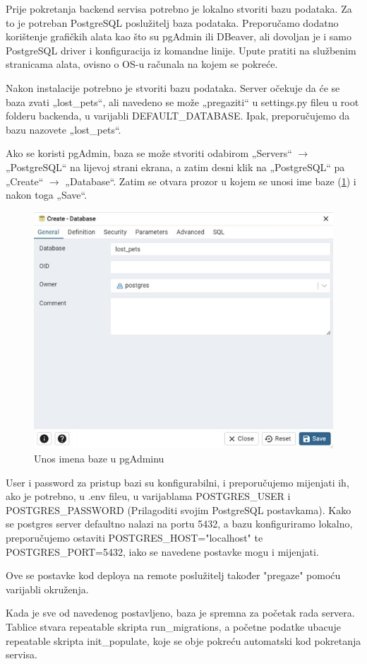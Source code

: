 		Prije pokretanja backend servisa potrebno je lokalno stvoriti bazu podataka. Za to je potreban PostgreSQL poslužitelj baza podataka. Preporučamo dodatno korištenje grafičkih alata kao što su pgAdmin ili DBeaver, ali dovoljan je i samo PostgreSQL driver i konfiguracija iz komandne linije. Upute pratiti na službenim stranicama alata, ovisno o OS-u računala na kojem se pokreće.
		
		Nakon instalacije potrebno je stvoriti bazu podataka. Server očekuje da će se baza zvati „lost\_pets“, ali navedeno se može „pregaziti“ u settings.py fileu u root folderu backenda, u varijabli DEFAULT\_DATABASE. Ipak, preporučujemo da bazu nazovete „lost\_pets“.
		
		Ako se koristi pgAdmin, baza se može stvoriti odabirom „Servers“ $\rightarrow$ „PostgreSQL“ na lijevoj strani ekrana, a zatim desni klik na „PostgreSQL“ pa „Create“ $\rightarrow$ „Database“. Zatim se otvara prozor u kojem se unosi ime baze (\ref{fig:deploy1}) i nakon toga „Save“.
		
		\begin{figure}[H]
			\includegraphics[scale=0.65]{slike/deploy1.jpg} %
			\centering
			\caption{Unos imena baze u pgAdminu}
			\label{fig:deploy1}
		\end{figure}
		
		User i password za pristup bazi su konfigurabilni, i preporučujemo mijenjati ih, ako je potrebno, u .env fileu, u varijablama POSTGRES\_USER i POSTGRES\_PASSWORD (Prilagoditi svojim PostgreSQL postavkama). Kako se postgres server defaultno nalazi na portu 5432, a bazu konfiguriramo lokalno, preporučujemo ostaviti POSTGRES\_HOST="localhost" te POSTGRES\_PORT=5432, iako se navedene postavke mogu i mijenjati.
		
		Ove se postavke kod deploya na remote poslužitelj također "pregaze" pomoću varijabli okruženja.
		
		Kada je sve od navedenog postavljeno, baza je spremna za početak rada servera. Tablice stvara repeatable skripta run\_migrations, a početne podatke ubacuje repeatable skripta init\_populate, koje se obje pokreću automatski kod pokretanja servisa.
		
		
		\eject
		